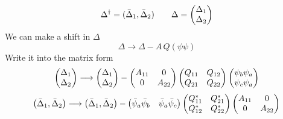 \[
\Delta^{\dagger}=(\bar\Delta_{1},\bar\Delta_{2})\qquad\Delta=\begin{pmatrix}\Delta_{1}\\\Delta_{2}\end{pmatrix}
\]
We can make a shift in $\Delta$
\begin{equation}
\Delta\longrightarrow\Delta-A\,Q(\psi\psi)
\end{equation}
Write it into the matrix form
\begin{equation*}
\begin{pmatrix}\Delta_{1}\\\Delta_{2}\end{pmatrix}\longrightarrow
	\begin{pmatrix}\Delta_{1}\\\Delta_{2}\end{pmatrix}-\begin{pmatrix}A_{11}&0\\0&A_{22}\end{pmatrix}\begin{pmatrix}Q_{11}&Q_{12}\\Q_{21}&Q_{22}\end{pmatrix}
	\begin{pmatrix}\psi_{b}\psi_{a}\\\psi_{c}\psi_{a}\end{pmatrix}
\end{equation*}
\begin{equation*}
\begin{pmatrix}\bar\Delta_{1},\bar\Delta_{2}\end{pmatrix}\longrightarrow
	\begin{pmatrix}\bar\Delta_{1},\bar\Delta_{2}\end{pmatrix}-
	\begin{pmatrix}\bar\psi_{a}\bar\psi_{b}&\bar\psi_{a}\bar\psi_{c}\end{pmatrix}
	\begin{pmatrix}Q_{11}^{*}&Q_{21}^{*}\\Q_{12}^{*}&Q_{22}^{*}\end{pmatrix}\begin{pmatrix}A_{11}&0\\0&A_{22}\end{pmatrix}
\end{equation*}

